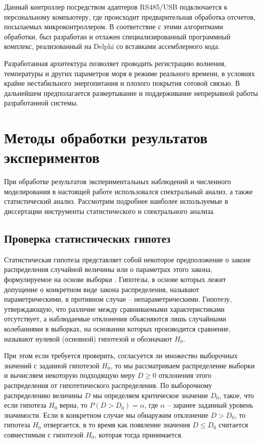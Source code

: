 Данный контроллер посредством адаптеров RS485/USB подключается к персональному компьютеру, где происходит предварительная обработка отсчетов, посылаемых микроконтроллером. В соответствие с этими алгоритмами обработки, был разработан и отлажен специализированный программный комплекс, реализованный на Delphi со вставками ассемблерного кода.

Разработанная архитектура позволяет проводить регистрацию волнения, температуры и других параметров моря в режиме реального времени, в условиях крайне нестабильного энергопитания и плохого покрытия сотовой связью. В дальнейшем предполагается развертывание и поддерживание непрерывной работы разработанной системы.
\section{Методы обработки результатов экспериментов}


При обработке результатов экспериментальных наблюдений и численного моделирования в настоящей работе использовался спектральный анализ, а также статистический анализ. Рассмотрим подробнее наиболее используемые в диссертации инструменты статистического и спектрального анализа.

\subsection{Проверка статистических гипотез}

Статистическая гипотеза представляет собой некоторое предположение о законе распределения случайной величины или о параметрах этого закона, формулируемое на основе выборки \cite{gmurman, leman, hodasev}. Гипотезы, в основе которых лежит допущение о конкретном виде закона распределения, называют параметрическими, в противном случае – непараметрическими. Гипотезу, утверждающую, что различие между сравниваемыми характеристиками отсутствует, а наблюдаемые отклонения объясняются лишь случайными колебаниями в выборках, на основании которых производится сравнение, называют нулевой (основной) гипотезой и обозначают $H_0$.

При этом если требуется проверить, согласуется ли множество выборочных значений с заданной гипотезой $H_0$, то мы рассматриваем распределение выборки и вычисляем некоторую подходящую меру $D\ge0$ отклонения этого распределения от гипотетического распределения. По выборочному распределению величины $D$ мы определяем критическое значение $D_0$, такое, что если гипотеза $H_0$  верна, то $P(D>D_0)=\alpha$, где $\alpha$ -- заранее заданный уровень значимости. Если в конкретном случае мы обнаружим отклонение $D>D_0$, то гипотеза $H_0$ отвергается, в то время как появление значения $D\le D_0$ считается совместимым с гипотезой $H_0$, которая тогда принимается.

